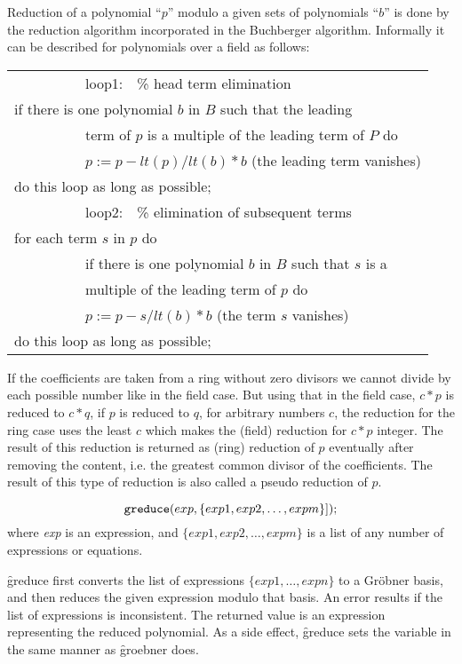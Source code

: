  \label{groebner:background}
Reduction of a polynomial ``$p$'' modulo a given sets of polynomials
``$b$'' is done by the reduction algorithm incorporated in the
Buchberger algorithm. Informally it can be described for
polynomials over a field as follows:
\begin{center}
\begin{tabular}{l}
~~~~~~~~~~loop1:~~\% head term elimination \\
if there is one polynomial $b$ in $B$ such that the leading \\
~~~~~~~~~~term of $p$ is a multiple of the leading term of $P$ do \\
~~~~~~~~~~$p := p - lt(p)/lt(b) * b$  (the leading term vanishes) \\
do this loop as long as possible; \\
~~~~~~~~~~loop2:~~\% elimination of subsequent terms \\
for each term $s$ in $p$ do \\
~~~~~~~~~~if there is one polynomial $b$ in $B$ such that $s$ is a \\
~~~~~~~~~~multiple of the leading term of $p$ do \\
~~~~~~~~~~$p := p - s/lt(b) * b$ (the term $s$ vanishes) \\
do this loop as long as possible;
\end{tabular}
\end{center}

If the coefficients are taken from a ring without zero divisors we
cannot divide by each possible number like in the field case. But
using that in the field case,  $c*p $ is reduced to  $c*q $, if $ p $
is reduced to $ q $, for arbitrary numbers $ c $,  the reduction for
the ring case uses the least $ c $ which makes the (field) reduction
for $ c*p $ integer. The result of this reduction is returned as
(ring) reduction of $ p $ eventually after removing the content, i.e.
the greatest common divisor of the coefficients. The result of this
type of reduction is also called a pseudo reduction of $ p $.

\hypertarget{operator:GREDUCE}{}
\[
\texttt{greduce}(exp, \{exp1, exp2, \ldots , expm\}]);
\]
where {\it exp} is an expression, and $\{exp1, exp2,\ldots , expm\}$ is
a list of any number of expressions or equations.

\f{greduce} first converts the list of expressions $\{exp1, \ldots ,
expn\}$ to a Gr\"obner basis, and then reduces the given expression
modulo that basis.  An error results if the list of expressions is
inconsistent. The returned value is an expression representing the
reduced polynomial. As a side effect, \f{greduce} sets the variable
 in the same manner as \f{groebner} does.

